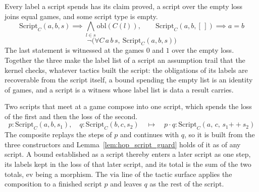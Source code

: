 \begin{lemma}
  \label{lem:hop_script_guard}
  \rocqok
  Every label a script spends has its claim proved, a script over the empty
  loss joins equal games, and some script type is empty.
  \[ \mathrm{Script}_C(a, b, s) \implies
       \bigwedge_{l \in s} \mathrm{obl}(C(l)), \qquad
     \mathrm{Script}_C(a, b, [\,]) \implies a = b \]
  \[ \neg\big(\forall C\, a\, b\, s,\ \mathrm{Script}_C(a, b, s)\big) \]
  The last statement is witnessed at the games $0$ and $1$ over the empty
  loss. Together the three make the label list of a script an assumption trail
  that the kernel checks, whatever tactics built the script: the obligations of
  its labels are recoverable from the script itself, a bound spending the empty
  list is an identity of games, and a script is a witness whose label list is
  data a result carries.
\end{lemma}

\begin{definition}
  \label{def:script_cat}
  \rocqok
  Two scripts that meet at a game compose into one script, which spends the
  loss of the first and then the loss of the second.
  \[ p : \mathrm{Script}_C(a, b, s_1),\quad q : \mathrm{Script}_C(b, c, s_2)
     \quad\longmapsto\quad
     p \cdot q : \mathrm{Script}_C(a,\, c,\, s_1 \mathbin{+\!\!+} s_2) \]
  The composite replays the steps of $p$ and continues with $q$, so it is built
  from the three constructors and Lemma~\ref{lem:hop_script_guard} holds of it
  as of any script. A bound established as a script thereby enters a later
  script as one step, its labels kept in the loss of that later script, and
  its total is the sum of the two totals, $\mathrm{ev}$ being a morphism. The
  $\mathrm{via}$ line of the tactic surface applies the composition to a
  finished script $p$ and leaves $q$ as the rest of the script.
\end{definition}

